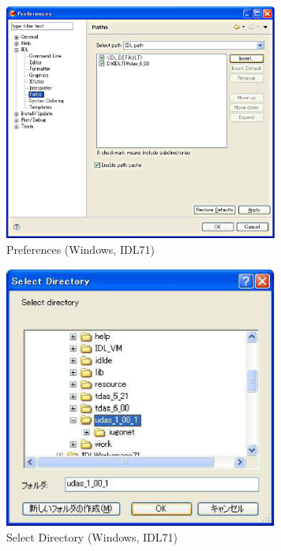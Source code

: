 \documentclass[a4j]{jbook}
\begin{document}
\begin{figure}[H]
\begin{center}
\includegraphics[width=9cm]{images/fig_idl71/Fig3.eps}
\caption{Preferences (Windows, IDL71)}
\label{idl71/Fig3.eps}
\end{center}
\end{figure}

\begin{figure}[H]
\begin{center}
\includegraphics[width=9cm]{images/fig_idl71/Fig8.eps}
\caption{Select Directory (Windows, IDL71)}
\label{idl71/Fig8.eps}
\end{center}
\end{figure}
\end{document}
